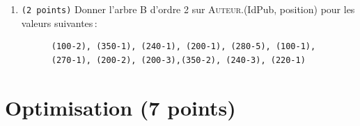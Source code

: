 \begin{enumerate}
\begin{solution}
\begin{itemize}
	\item clé : 3+(1+4) + (1+1) + 10
	\item ordre : 180
	\item $log_{180}(1,55 \times 10^8) = 4$
\end{itemize}
\end{solution}

	\item {\tt (2~points)} Donner l'arbre B  d'ordre 2 sur \textsc{Auteur}.(IdPub, position)
  pour les valeurs suivantes\,:\\

  \begin{verbatim}
      (100-2), (350-1), (240-1), (200-1), (280-5), (100-1),
      (270-1), (200-2), (200-3),(350-2), (240-3), (220-1)
  \end{verbatim}

  \begin{solution}
\begin{figure}
	\centering
	\caption{}
	\label{fig:2018-06btree}
\end{figure}
\end{solution}

\end{enumerate}

\section{Optimisation (7 points)}

